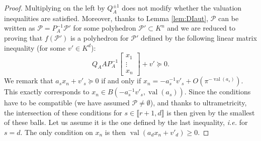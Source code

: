 \documentclass{elsarticle}
\theoremstyle{plain}
\theoremstyle{definition}
\newcommand{\PP}{\mathcal{P}}
\DeclareMathOperator{\val}{val}
\begin{document}
\begin{proof}
Multiplying on the left by $Q_A^{\pm 1}$ does not
modify whether the valuation inequalities are satisfied.
Moreover, thanks to Lemma \ref{lem:DIaut},
$\PP$ can be written as
$\PP = P_A^{-1} \PP'$ for some polyhedron $\PP' \subset K^n$
and we are reduced to proving that
$f(\PP')$ is a polyhedron for $\PP'$
defined by the following linear matrix inequality (for some $v' \in K^d$):
\[
Q_A A P_A^{-1}
\begin{bmatrix}
  x_1 \\ \vdots \\ x_n
\end{bmatrix}
+ v' \succeq 0.
\]
We remark that 
$a_s x_n + v'_s \succeq 0$
if and only if $x_n = -a_s^{-1} v'_s + O(\pi^{- \val(a_s)}).$
This exactly corresponds to $x_n \in B(-a_s^{-1} v'_s,\val(a_s)).$
Since the conditions have to be compatible (we have assumed
$\PP\neq\emptyset$), and thanks to ultrametricity,  
the intersection of these conditions for $s \in \llbracket r+1, d \rrbracket$
is then given by the smallest of these balls.
Let us assume it is the one defined by the last inequality, \textit{i.e.} for $s = d.$
The only condition on $x_n$
is then $\val(a_dx_n + v'_d) \geq 0.$


\end{proof}
\end{document}
